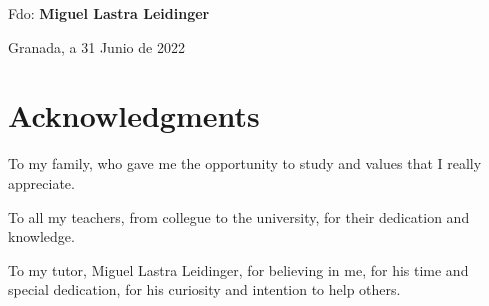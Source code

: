 \noindent Fdo: \textbf{Miguel Lastra Leidinger}

\vspace{2cm}

\begin{flushright}
Granada, a 31 Junio de 2022
\end{flushright}

\chapter*{Acknowledgments}
\thispagestyle{empty}

\vspace{1cm}

\noindent To my family, who gave me the opportunity to study and values that I really appreciate.

\bigskip
\noindent To all my teachers, from collegue to the university, for their dedication and knowledge.

\bigskip
\noindent To my tutor, Miguel Lastra Leidinger, for believing in me, for his time and special dedication, for his curiosity and intention to help others.






